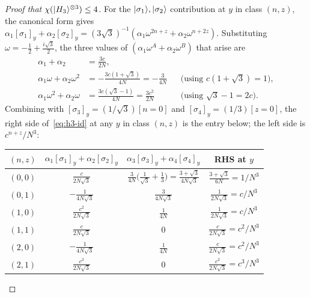 \documentclass[11pt]{article}
\theoremstyle{definition}
\newcommand{\microspace}{\mspace{0.5mu}}
\newcommand{\ket}[1]{\lvert\microspace #1 \microspace \rangle}
\newcommand{\chiR}{\chi}
\newcommand{\Hth}{\ket{H_3}}
\begin{document}
\begin{proof}[Proof that $\chiR(\Hth^{\otimes 3}) \le 4$]
		For the $\ket{\sigma_1}, \ket{\sigma_2}$ contribution at $y$ in class $(n, z)$,
		the canonical form gives
		$\alpha_1 [\sigma_1]_y + \alpha_2 [\sigma_2]_y = (3 \sqrt 3)^{-1}
		(\alpha_1 \omega^{2n + z} + \alpha_2 \omega^{n + 2z})$. Substituting
		$\omega = -\frac{1}{2} + \frac{i \sqrt 3}{2}$, the three values of
		$(\alpha_1 \omega^A + \alpha_2 \omega^B)$ that arise are
		\begin{equation}\label{eq:h3-three-values}
			\begin{aligned}
				\alpha_1 + \alpha_2 &= \frac{3 c}{2 N}, \\
				\alpha_1 \omega + \alpha_2 \omega^2
				&= -\frac{3 c (1 + \sqrt 3)}{4 N}
				= -\frac{3}{4 N}
				&& \text{(using $c(1 + \sqrt 3) = 1$)}, \\
				\alpha_1 \omega^2 + \alpha_2 \omega
				&= \frac{3 c (\sqrt 3 - 1)}{4 N}
				= \frac{3 c^2}{2 N}
				&& \text{(using $\sqrt 3 - 1 = 2 c$)}.
			\end{aligned}
		\end{equation}
		Combining with $[\sigma_3]_y = (1/\sqrt 3) [n = 0]$ and
		$[\sigma_4]_y = (1/3)[z = 0]$, the right side of~\eqref{eq:h3-id} at any
		$y$ in class $(n, z)$ is the entry below; the left side is
		$c^{n+z}/N^3$:
		
		\begin{center}
			\renewcommand{\arraystretch}{1.4}
			\begin{tabular}{c|c|c|c}
				\toprule
				$(n, z)$ & $\alpha_1[\sigma_1]_y + \alpha_2[\sigma_2]_y$ &
				$\alpha_3[\sigma_3]_y + \alpha_4[\sigma_4]_y$ &
				RHS at $y$ \\
				\midrule
				$(0, 0)$ & $\frac{c}{2 N \sqrt 3}$ &
				$\frac{3}{4 N}\big(\frac{1}{\sqrt 3} + \frac{1}{3}\big)
				= \frac{3 + \sqrt 3}{4 N \sqrt 3}$ &
				$\frac{3 + \sqrt 3}{6 N} = 1 / N^3$ \\
				$(0, 1)$ & $-\frac{1}{4 N \sqrt 3}$ &
				$\frac{3}{4 N \sqrt 3}$ &
				$\frac{1}{2 N \sqrt 3} = c / N^3$ \\
				$(1, 0)$ & $\frac{c^2}{2 N \sqrt 3}$ &
				$\frac{1}{4 N}$ &
				$\frac{1}{2 N \sqrt 3} = c / N^3$ \\
				$(1, 1)$ & $\frac{c}{2 N \sqrt 3}$ &
				$0$ &
				$\frac{c}{2 N \sqrt 3} = c^2 / N^3$ \\
				$(2, 0)$ & $-\frac{1}{4 N \sqrt 3}$ &
				$\frac{1}{4 N}$ &
				$\frac{c}{2 N \sqrt 3} = c^2 / N^3$ \\
				$(2, 1)$ & $\frac{c^2}{2 N \sqrt 3}$ &
				$0$ &
				$\frac{c^2}{2 N \sqrt 3} = c^3 / N^3$ \\
				\bottomrule
			\end{tabular}
		\end{center}
		

\end{proof}
\end{document}
